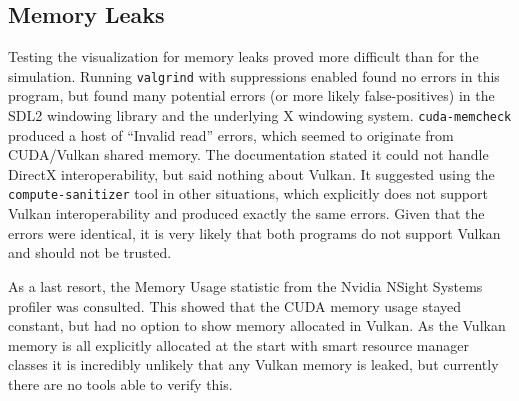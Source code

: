 \subsection{Memory Leaks}\label{sec:Results:Viz:Memory}
Testing the visualization for memory leaks proved more difficult than for the simulation.
Running \texttt{valgrind} with suppressions enabled found no errors in this program, but found many potential errors (or more likely false-positives) in the SDL2 windowing library and the underlying X windowing system.
\texttt{cuda-memcheck} produced a host of ``Invalid read'' errors, which seemed to originate from CUDA/Vulkan shared memory.
The documentation stated it could not handle DirectX interoperability\cite{NvidiaCudaMemcheckIssues}, but said nothing about Vulkan.
It suggested using the \texttt{compute-sanitizer} tool in other situations, which explicitly does not support Vulkan interoperability\cite{NvidiaComputeSanitizerRelease} and produced exactly the same errors.
Given that the errors were identical, it is very likely that both programs do not support Vulkan and should not be trusted.

As a last resort, the Memory Usage statistic from the Nvidia NSight Systems profiler was consulted.
This showed that the CUDA memory usage stayed constant, but had no option to show memory allocated in Vulkan.
As the Vulkan memory is all explicitly allocated at the start with smart resource manager classes it is incredibly unlikely that any Vulkan memory is leaked, but currently there are no tools able to verify this.